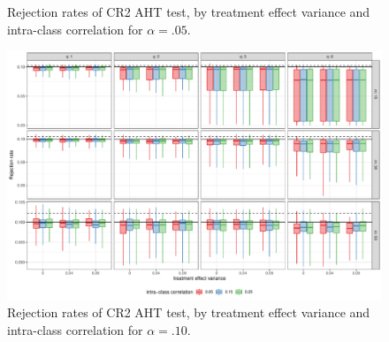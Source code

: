 \documentclass[12pt]{article}
\begin{document}
\begin{landscape}
\begin{figure}[H]
{}

\caption{Rejection rates of CR2 AHT test, by treatment effect variance and intra-class correlation for $\alpha = .05$.}\label{fig:misspecification_05}
\end{figure}

\begin{figure}[H]

{\centering \includegraphics[width=\linewidth]{CR_fig/misspecification_10-1} 

}

\caption{Rejection rates of CR2 AHT test, by treatment effect variance and intra-class correlation for $\alpha = .10$.}\label{fig:misspecification_10}
\end{figure}

\end{landscape}



\end{document}
